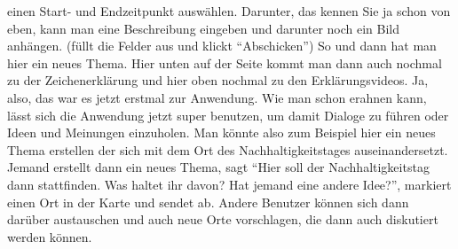 \begin{itemize}
einen Start- und Endzeitpunkt ausw{\"a}hlen. Darunter, das kennen Sie ja schon von eben, kann man eine Beschreibung eingeben und darunter noch ein Bild anh{\"a}ngen. (f{\"u}llt die Felder aus und klickt "`Abschicken"') So und dann hat man hier ein neues Thema. Hier unten auf der Seite kommt man dann auch nochmal zu der Zeichenerkl{\"a}rung und hier oben nochmal zu den Erkl{\"a}rungsvideos. Ja, also, das war es jetzt erstmal zur Anwendung. Wie man schon erahnen kann, l{\"a}sst sich die Anwendung jetzt super benutzen, um damit Dialoge zu f{\"u}hren oder Ideen und Meinungen einzuholen. Man k{\"o}nnte also zum Beispiel hier ein neues Thema erstellen der sich mit dem Ort des Nachhaltigkeitstages auseinandersetzt. Jemand erstellt dann ein neues Thema, sagt "`Hier soll der Nachhaltigkeitstag dann stattfinden. Was haltet ihr davon? Hat jemand eine andere Idee?"', markiert einen Ort in der Karte und sendet ab. Andere Benutzer k{\"o}nnen sich dann dar{\"u}ber austauschen und auch neue Orte vorschlagen, die dann auch diskutiert werden k{\"o}nnen.
\end{itemize}